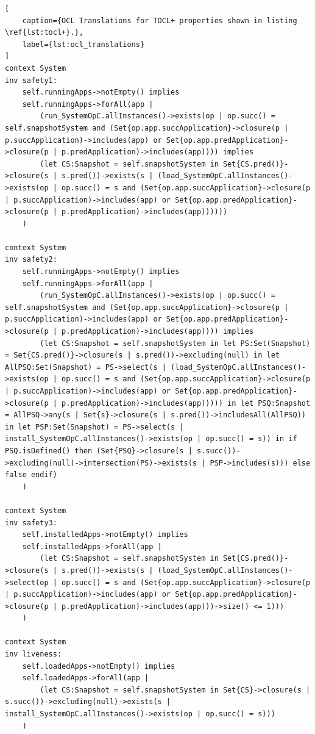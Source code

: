 \begin{lstlisting}[
    caption={OCL Translations for TOCL+ properties shown in listing \ref{lst:tocl+}.},
    label={lst:ocl_translations}
]
context System
inv safety1:
    self.runningApps->notEmpty() implies
    self.runningApps->forAll(app |
        (run_SystemOpC.allInstances()->exists(op | op.succ() = self.snapshotSystem and (Set{op.app.succApplication}->closure(p | p.succApplication)->includes(app) or Set{op.app.predApplication}->closure(p | p.predApplication)->includes(app)))) implies
        (let CS:Snapshot = self.snapshotSystem in Set{CS.pred()}->closure(s | s.pred())->exists(s | (load_SystemOpC.allInstances()->exists(op | op.succ() = s and (Set{op.app.succApplication}->closure(p | p.succApplication)->includes(app) or Set{op.app.predApplication}->closure(p | p.predApplication)->includes(app))))))
    )

context System
inv safety2:
    self.runningApps->notEmpty() implies
    self.runningApps->forAll(app |
        (run_SystemOpC.allInstances()->exists(op | op.succ() = self.snapshotSystem and (Set{op.app.succApplication}->closure(p | p.succApplication)->includes(app) or Set{op.app.predApplication}->closure(p | p.predApplication)->includes(app)))) implies
        (let CS:Snapshot = self.snapshotSystem in let PS:Set(Snapshot) = Set{CS.pred()}->closure(s | s.pred())->excluding(null) in let AllPSQ:Set(Snapshot) = PS->select(s | (load_SystemOpC.allInstances()->exists(op | op.succ() = s and (Set{op.app.succApplication}->closure(p | p.succApplication)->includes(app) or Set{op.app.predApplication}->closure(p | p.predApplication)->includes(app))))) in let PSQ:Snapshot = AllPSQ->any(s | Set{s}->closure(s | s.pred())->includesAll(AllPSQ)) in let PSP:Set(Snapshot) = PS->select(s | install_SystemOpC.allInstances()->exists(op | op.succ() = s)) in if PSQ.isDefined() then (Set{PSQ}->closure(s | s.succ())->excluding(null)->intersection(PS)->exists(s | PSP->includes(s))) else false endif)
    )

context System
inv safety3:
    self.installedApps->notEmpty() implies
    self.installedApps->forAll(app |
        (let CS:Snapshot = self.snapshotSystem in Set{CS.pred()}->closure(s | s.pred())->exists(s | (load_SystemOpC.allInstances()->select(op | op.succ() = s and (Set{op.app.succApplication}->closure(p | p.succApplication)->includes(app) or Set{op.app.predApplication}->closure(p | p.predApplication)->includes(app)))->size() <= 1)))
    )

context System
inv liveness:
    self.loadedApps->notEmpty() implies
    self.loadedApps->forAll(app |
        (let CS:Snapshot = self.snapshotSystem in Set{CS}->closure(s | s.succ())->excluding(null)->exists(s | install_SystemOpC.allInstances()->exists(op | op.succ() = s)))
    )
\end{lstlisting}



